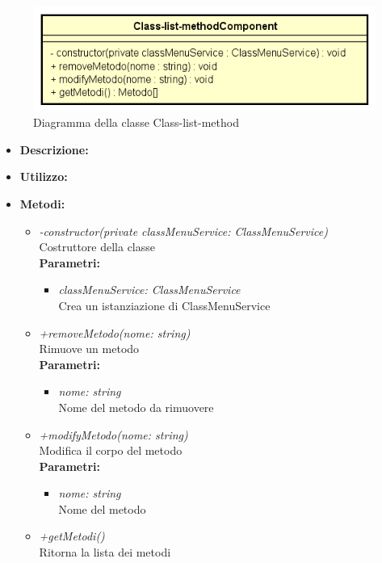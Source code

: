 \begin{figure}[h!]
	\centering
	\includegraphics[scale=0.8]{res/sections/SpecificaFrontEnd/Components/Disegnetti/class-list-method.png}
	\caption{Diagramma della classe Class-list-method}
\end{figure}

\begin{itemize}
	\item \textbf{Descrizione:}\\
	
	\item \textbf{Utilizzo:}\\
	
	\item \textbf{Metodi:}
		\begin{itemize}
			\item \emph{-constructor(private classMenuService: ClassMenuService)}\\
    		Costruttore della classe\\
    		\textbf{Parametri:}
    		\begin{itemize}
    			\item \emph{classMenuService: ClassMenuService}\\
    			Crea un istanziazione di ClassMenuService
    		\end{itemize}
    		\item \emph{+removeMetodo(nome: string)}\\
    		Rimuove un metodo\\
    		\textbf{Parametri:}
    		\begin{itemize}
    			\item \emph{nome: string}\\
    			Nome del metodo da rimuovere
    		\end{itemize}
    		\item \emph{+modifyMetodo(nome: string)}\\
    		Modifica il corpo del metodo\\
    		\textbf{Parametri:}
    		\begin{itemize}
    			\item \emph{nome: string}\\
    			Nome del metodo
    		\end{itemize}
    		\item \emph{+getMetodi()}\\
    		Ritorna la lista dei metodi
		\end{itemize}
\end{itemize}